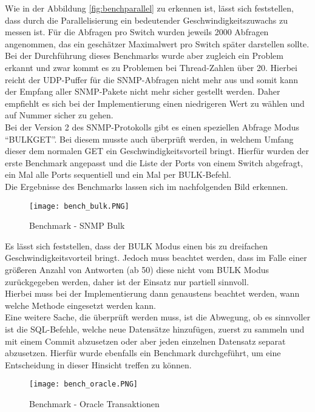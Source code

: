 Wie in der Abbildung \ref{fig:benchparallel} zu erkennen ist, lässt sich feststellen, dass durch die Parallelisierung ein bedeutender Geschwindigkeitszuwachs zu messen ist.
Für die Abfragen pro Switch wurden jeweils 2000 Abfragen angenommen, das ein geschätzer Maximalwert pro Switch später darstellen sollte.\\
Bei der Durchführung dieses Benchmarks wurde aber zugleich ein Problem erkannt und zwar kommt es zu Problemen bei Thread-Zahlen über 20. Hierbei reicht der UDP-Puffer für die SNMP-Abfragen nicht mehr aus und somit kann der Empfang aller SNMP-Pakete nicht mehr sicher gestellt werden.
Daher empfiehlt es sich bei der Implementierung einen niedrigeren Wert zu wählen und auf Nummer sicher zu gehen.\\
Bei der Version 2 des SNMP-Protokolls gibt es einen speziellen Abfrage Modus “BULKGET”. Bei diesem musste auch überprüft werden, in welchem Umfang dieser dem normalen GET ein Geschwindigkeitsvorteil bringt. Hierfür wurden der erste Benchmark angepasst und die Liste der Ports von einem Switch abgefragt, ein Mal alle Ports sequentiell und ein Mal per BULK-Befehl.\\
Die Ergebnisse des Benchmarks lassen sich im nachfolgenden Bild erkennen.\\

\begin{figure}[H]
\centering
\texttt{[image: bench\_bulk.PNG]}
\caption{Benchmark - SNMP Bulk}
\label{fig:benchsnmpbulk}
\end{figure}

Es lässt sich feststellen, dass der BULK Modus einen bis zu dreifachen Geschwindigkeitsvorteil bringt. Jedoch muss beachtet werden, dass im Falle einer größeren Anzahl von Antworten (ab 50) diese nicht vom BULK Modus zurückgegeben werden, daher ist der Einsatz nur partiell sinnvoll.\\
Hierbei muss bei der Implementierung dann genaustens beachtet werden, wann welche Methode eingesetzt werden kann.\\

Eine weitere Sache, die überprüft werden muss, ist die Abwegung, ob es sinnvoller ist die SQL-Befehle, welche neue Datensätze hinzufügen, zuerst zu sammeln und mit einem Commit abzusetzen oder aber jeden einzelnen Datensatz separat abzusetzen.
Hierfür wurde ebenfalls ein Benchmark durchgeführt, um eine Entscheidung in dieser Hinsicht treffen zu können.\\

\begin{figure}[H]
\centering
\texttt{[image: bench\_oracle.PNG]}
\caption{Benchmark - Oracle Transaktionen}
\label{fig:benchoracletransactions}
\end{figure}

